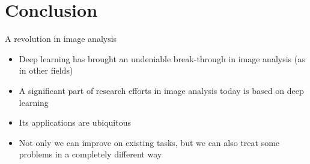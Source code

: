 \documentclass[xcolor=pdftex,dvipsnames,table,mathserif,aspectratio=169]{beamer}
\begin{document}
\section*{Conclusion}







\begin{frame}{A revolution in image analysis}

  \begin{itemize}
  \item Deep learning has brought an undeniable break-through in image analysis (as in other fields)
  \item A significant part of research efforts in image analysis today is based on deep learning
  \item Its applications are ubiquitous
  \item Not only we can improve on existing tasks, but we can also treat some problems in a completely different way
  \end{itemize}

\end{frame}

\end{document}

